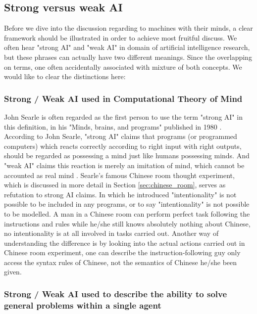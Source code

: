 \documentclass[11pt]{article}
\newenvironment{draft}{\color{dark-cornflower-blue-2}}{\ignorespacesafterend}
\begin{document}

\subsection{Strong versus weak AI}

\begin{draft}
Before we dive into the discussion regarding to machines with their minds, a clear framework should be illustrated in order to achieve most fruitful discuss. We often hear "strong AI" and "weak AI" in domain of artificial intelligence research, but these phrases can actually have two different meanings. Since the overlapping on terms, one often accidentally associated with mixture of both concepts. We would like to clear the distinctions here: 

\subsubsection*{Strong / Weak AI used in Computational Theory of Mind}

John Searle is often regarded as the first person to use the term "strong AI" in this definition, in his "Minds, brains, and programs" published in 1980 \cite{searle1980minds}. According to John Searle, "strong AI" claims that programs (or programmed computers) which reacts correctly according to right input with right outputs, should be regarded as possessing a mind just like humans possessing minds. And "weak AI" claims this reaction is merely an imitation of mind, which cannot be accounted as real mind . Searle's famous Chinese room thought experiment, which is discussed in more detail in Section \ref{sec:chinese_room}, serves as refutation to strong AI claims. In which he introduced "intentionality" is not possible to be included in any programs, or to say "intentionality" is not possible to be modelled. A man in a Chinese room can perform perfect task following the instructions and rules while he/she still knows absolutely nothing about Chinese, no intentionality is at all involved in tasks carried out. Another way of understanding the difference is by looking into the actual actions carried out in Chinese room experiment, one can describe the instruction-following guy only access the syntax rules of Chinese, not the semantics of Chinese he/she been given.

\subsubsection*{Strong / Weak AI used to describe the ability to solve general problems within a single agent}


\end{draft}
\end{document}
